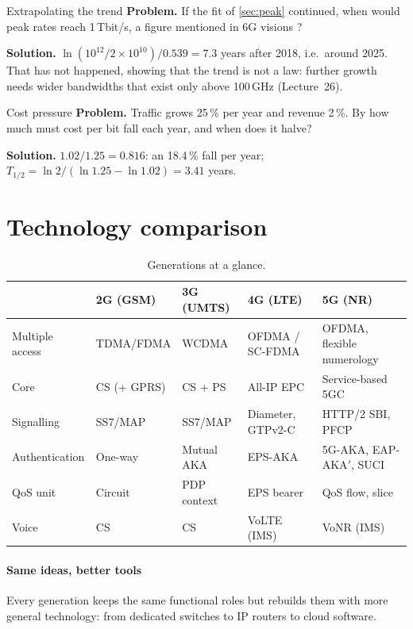 \documentclass[11pt,a4paper]{article}
\begin{document}
\begin{examplebox}{Extrapolating the trend}\label{ex:extra}
\textbf{Problem.} If the fit of \cref{sec:peak} continued, when would peak rates reach 1\,Tbit/s, a figure mentioned in 6G visions \cite{saad2020vision}?

\textbf{Solution.} $\ln(10^{12}/2\times10^{10})/0.539 = 7.3$ years after 2018, i.e.\ around 2025. That has not happened, showing that the trend is not a
law: further growth needs wider bandwidths that exist only above 100\,GHz (Lecture~26).
\end{examplebox}

\begin{examplebox}{Cost pressure}\label{ex:cost}
\textbf{Problem.} Traffic grows 25\,\% per year and revenue 2\,\%. By how much must cost per bit fall each year, and when does it halve?

\textbf{Solution.} $1.02/1.25 = 0.816$: an 18.4\,\% fall per year; $T_{1/2} = \ln 2/(\ln 1.25 - \ln 1.02) = 3.41$ years.
\end{examplebox}

\section{Technology comparison}
\begin{table}[htbp]
\centering\small
\caption{Generations at a glance.}\label{tab:cmp}
\begin{tabularx}{\linewidth}{@{}l Y Y Y Y@{}}
\toprule
{} & 2G (GSM) & 3G (UMTS) & 4G (LTE) & 5G (NR) \\
\midrule
Multiple access & TDMA/FDMA & WCDMA & OFDMA / SC-FDMA & OFDMA, flexible numerology \\
Core & CS (+ GPRS) & CS + PS & All-IP EPC & Service-based 5GC \\
Signalling & SS7/MAP & SS7/MAP & Diameter, GTPv2-C & HTTP/2 SBI, PFCP \\
Authentication & One-way & Mutual AKA & EPS-AKA & 5G-AKA, EAP-AKA$'$, SUCI \\
QoS unit & Circuit & PDP context & EPS bearer & QoS flow, slice \\
Voice & CS & CS & VoLTE (IMS) & VoNR (IMS) \\
\bottomrule
\end{tabularx}
\end{table}

\paragraph{Same ideas, better tools} Every generation keeps the same functional roles but rebuilds them with more general technology: from
dedicated switches to IP routers to cloud software.
\end{document}
